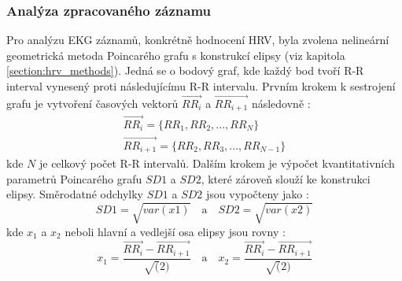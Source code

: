 \subsubsection{Analýza zpracovaného záznamu}
\label{section:analysis}
Pro analýzu EKG záznamů, konkrétně hodnocení HRV, byla zvolena nelineární
geometrická metoda Poincarého grafu s konstrukcí elipsy (viz kapitola
\ref{section:hrv_methods}). Jedná se o bodový graf, kde každý bod tvoří R-R
interval vynesený proti následujícímu R-R intervalu. Prvním krokem k sestrojení
grafu je vytvoření časových vektorů $\overrightarrow{RR_i}$ a
$\overrightarrow{RR_{i+1}}$ následovně \cite{Mazhar2007}:
\begin{gather}
    \overrightarrow{RR_i} = \{RR_1, RR_2,...,RR_{N}\} \\
    \overrightarrow{RR_{i+1}} = \{RR_2, RR_3,...,RR_{N-1}\}
\end{gather}
kde $N$ je celkový počet R-R intervalů. Dalším krokem je výpočet kvantitativních
parametrů Poincarého grafu $SD1$ a $SD2$, které zároveň slouží ke konstrukci
elipsy. Směrodatné odchylky $SD1$ a $SD2$ jsou vypočteny jako \cite{Mazhar2007}:
\begin{equation}
    SD1 = \sqrt{var(x1)}
    \quad \textrm{a} \quad
    SD2 = \sqrt{var(x2)}
\end{equation}
kde $x_1$ a $x_2$ neboli hlavní a vedlejší osa elipsy jsou rovny \cite{Mazhar2007}:
\begin{equation}
    x_1 = \frac{\overrightarrow{RR_i}-\overrightarrow{RR_{i+1}}}{\sqrt(2)}
    \quad \textrm{a} \quad
    x_2 = \frac{\overrightarrow{RR_i}-\overrightarrow{RR_{i+1}}}{\sqrt(2)}
\end{equation}

